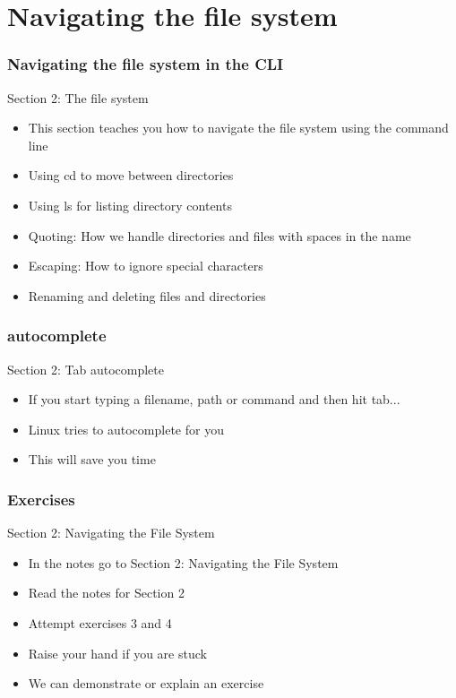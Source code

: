 \part{Navigating the file system}
\begin{frame}
\partpage
\end{frame}

\section{Navigating the file system in the CLI}
\begin{frame}{Section 2: The file system}
\begin{itemize}
\item This section teaches you how to navigate the file system using the command line
\item Using cd to move between directories
\item Using ls for listing directory contents
\item Quoting: How we handle directories and files with spaces in the name
\item Escaping: How to ignore special characters
\item Renaming and deleting files and directories
\end{itemize}
\end{frame}

\section{autocomplete}
\begin{frame}{Section 2: Tab autocomplete}
\begin{itemize}
\item If you start typing a filename, path or command and then hit tab...
\item Linux tries to autocomplete for you
\item This will save you time
\end{itemize}
\end{frame}

\section{Exercises}
\begin{frame}{Section 2: Navigating the File System}
\begin{itemize}
\item In the notes go to Section 2: Navigating the File System
\item Read the notes for Section 2
\item Attempt exercises 3 and 4
\item Raise your hand if you are stuck
\item We can demonstrate or explain an exercise
\end{itemize}
\end{frame}

